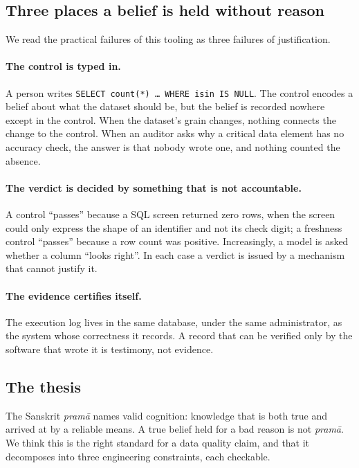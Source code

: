 \documentclass[11pt,a4paper]{article}
\renewcommand{\_}{\oldunderscore\allowbreak}
\theoremstyle{plain}
\theoremstyle{definition}
\theoremstyle{remark}
\newcommand{\pql}[1]{\texttt{#1}}
\begin{document}
\subsection{Three places a belief is held without reason}

We read the practical failures of this tooling as three failures of justification.

\paragraph{The control is typed in.} A person writes \pql{SELECT count(*) \ldots\ WHERE isin IS NULL}. The
control encodes a belief about what the dataset should be, but the belief is recorded nowhere except in
the control. When the dataset's grain changes, nothing connects the change to the control. When an auditor
asks why a critical data element has no accuracy check, the answer is that nobody wrote one, and nothing
counted the absence.

\paragraph{The verdict is decided by something that is not accountable.} A control ``passes'' because a SQL
screen returned zero rows, when the screen could only express the shape of an identifier and not its check
digit; a freshness control ``passes'' because a row count was positive. Increasingly, a model is asked
whether a column ``looks right''. In each case a verdict is issued by a mechanism that cannot justify it.

\paragraph{The evidence certifies itself.} The execution log lives in the same database, under the same
administrator, as the system whose correctness it records. A record that can be verified only by the
software that wrote it is testimony, not evidence.

\subsection{The thesis}\label{sec:thesis}

The Sanskrit \emph{pram\=a} names valid cognition: knowledge that is both true and arrived at by a reliable
means. A true belief held for a bad reason is not \emph{pram\=a}. We think this is the right standard for a
data quality claim, and that it decomposes into three engineering constraints, each checkable.
\end{document}
